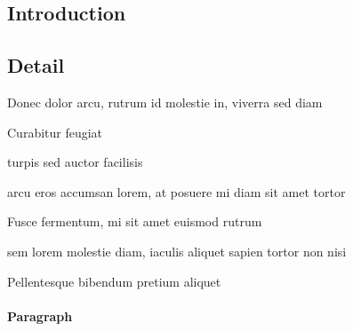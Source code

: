 





\maketitle

\begin{abstract}
	\noindent \lipsum[1] %
\end{abstract}

\begin{multicols}{2} %


\section{Introduction}\label{sec:intro}
\lipsum*[2-3] %

\subsection{Detail}

\begin{compactitem}
	\item Donec dolor arcu, rutrum id molestie in, viverra sed diam
	\item Curabitur feugiat
	\item turpis sed auctor facilisis
	\item arcu eros accumsan lorem, at posuere mi diam sit amet tortor
	\item Fusce fermentum, mi sit amet euismod rutrum
	\item sem lorem molestie diam, iaculis aliquet sapien tortor non nisi
	\item Pellentesque bibendum pretium aliquet
\end{compactitem}
\lipsum[4] %

\paragraph{Paragraph}
\lipsum[75]


\end{multicols}
